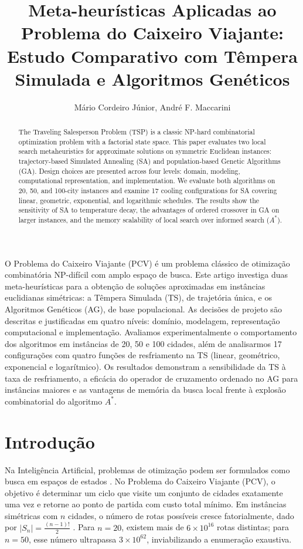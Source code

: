 \documentclass[11pt]{article}
\title{Meta-heurísticas Aplicadas ao Problema do Caixeiro Viajante:\\Estudo Comparativo com Têmpera Simulada e Algoritmos Genéticos}
\author{Mário Cordeiro Júnior\inst{1}, André F. Maccarini\inst{1}}
\begin{document}
 

\maketitle

\begin{resumo} 
O Problema do Caixeiro Viajante (PCV) é um problema clássico de otimização combinatória NP-difícil com amplo espaço de busca. Este artigo investiga duas meta-heurísticas para a obtenção de soluções aproximadas em instâncias euclidianas simétricas: a Têmpera Simulada (TS), de trajetória única, e os Algoritmos Genéticos (AG), de base populacional. As decisões de projeto são descritas e justificadas em quatro níveis: domínio, modelagem, representação computacional e implementação. Avaliamos experimentalmente o comportamento dos algoritmos em instâncias de 20, 50 e 100 cidades, além de analisarmos 17 configurações com quatro funções de resfriamento na TS (linear, geométrico, exponencial e logarítmico). Os resultados demonstram a sensibilidade da TS à taxa de resfriamento, a eficácia do operador de cruzamento ordenado no AG para instâncias maiores e as vantagens de memória da busca local frente à explosão combinatorial do algoritmo $A^*$.
\end{resumo}

\begin{abstract}
The Traveling Salesperson Problem (TSP) is a classic NP-hard combinatorial optimization problem with a factorial state space. This paper evaluates two local search metaheuristics for approximate solutions on symmetric Euclidean instances: trajectory-based Simulated Annealing (SA) and population-based Genetic Algorithms (GA). Design choices are presented across four levels: domain, modeling, computational representation, and implementation. We evaluate both algorithms on 20, 50, and 100-city instances and examine 17 cooling configurations for SA covering linear, geometric, exponential, and logarithmic schedules. The results show the sensitivity of SA to temperature decay, the advantages of ordered crossover in GA on larger instances, and the memory scalability of local search over informed search ($A^*$).
\end{abstract}

\section{Introdução}

Na Inteligência Artificial, problemas de otimização podem ser formulados como busca em espaços de estados \cite{russell2022ia}. No Problema do Caixeiro Viajante (PCV), o objetivo é determinar um ciclo que visite um conjunto de cidades exatamente uma vez e retorne ao ponto de partida com custo total mínimo. Em instâncias simétricas com $n$ cidades, o número de rotas possíveis cresce fatorialmente, dado por $|S_n| = \frac{(n-1)!}{2}$ \cite{campello1994algoritmos}. Para $n=20$, existem mais de $6 \times 10^{16}$ rotas distintas; para $n=50$, esse número ultrapassa $3 \times 10^{62}$, inviabilizando a enumeração exaustiva.
\end{document}
